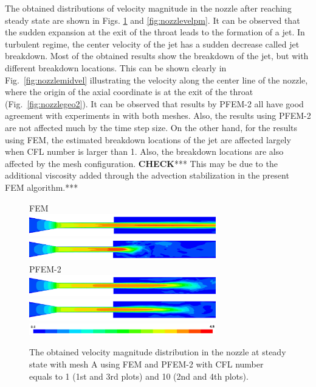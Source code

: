 The obtained distributions of velocity magnitude in the nozzle after reaching steady state are shown in Figs. \ref{fig:nozzlevelfm} and \ref{fig:nozzlevelpm}. It can be observed that the sudden expansion at the exit of the throat leads to the formation of a jet. In turbulent regime, the center velocity of the jet has a sudden decrease called jet breakdown. Most of the obtained results show the breakdown of the jet, but with different breakdown locations. This can be shown clearly in Fig.~\ref{fig:nozzlemidvel} illustrating the velocity along the center line of the nozzle, where the origin of the axial coordinate is at the exit of the throat (Fig.~\ref{fig:nozzlegeo2}). It can be observed that results by PFEM-2 all have good agreement with experiments in \cite{hariharan_nozzle} with both meshes. Also, the results using PFEM-2 are not affected much by the time step size. On the other hand, for the results using FEM, the estimated breakdown locations of the jet are affected largely when CFL number is larger than 1. Also, the breakdown locations are also affected by the mesh configuration. \textbf{CHECK}*** This may be due to the additional viscosity added through the advection stabilization in the present FEM algorithm.***

\begin{figure}[htbp]
    \centering
    FEM\\
    \includegraphics[width=3.2in]{imgs/nozzle_pump/nozzle_fem_fm_cfl1.png}
    \includegraphics[width=3.2in]{imgs/nozzle_pump/nozzle_fem_fm_cfl5.png}\\
    PFEM-2\\
    \includegraphics[width=3.2in]{imgs/nozzle_pump/nozzle_pfem_fm_cfl1.png}
    \includegraphics[width=3.2in]{imgs/nozzle_pump/nozzle_pfem_fm_cfl5.png}
    \includegraphics[width=3.2in]{imgs/nozzle_pump/nozzle_legend.png}
    \caption{The obtained velocity magnitude distribution in the nozzle at steady state with mesh A using FEM and PFEM-2 with CFL number equals to 1 (1st and 3rd plots) and 10 (2nd and 4th plots). }
    \label{fig:nozzlevelfm}
\end{figure}

